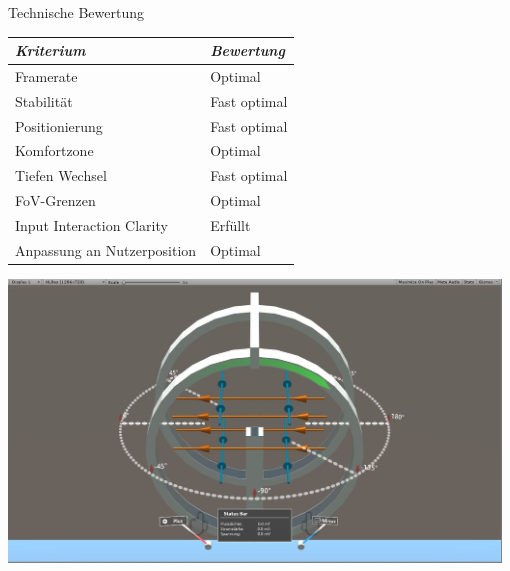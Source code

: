\begin{frame}[fragile]{Technische Bewertung}
\pause
\begin{minipage}{0.62\textwidth}
\bgroup
\setlength\extrarowheight{1pt}
\def\arraystretch{1.1}
\begin{table}
	\centering
	\begin{tabular}{m{4.1cm}|l}
		\textit{Kriterium} & \textit{Bewertung}\\
		\hline
		Framerate & Optimal\\
		\hline
		Stabilität & Fast optimal\\
		\hline
		Positionierung & Fast optimal\\
		\hline
		Komfortzone & Optimal\\
		\hline
		Tiefen Wechsel & Fast optimal\\
		\hline
		FoV-Grenzen & Optimal\\
		\hline
		Input Interaction Clarity & Erfüllt\\
		\hline
		Anpassung an Nutzerposition & Optimal\\
	\end{tabular}
\end{table}
\setlength\extrarowheight{0pt}
\def\arraystretch{1}
\egroup
\end{minipage}
\begin{minipage}{0.35\textwidth}
	\includegraphics[width=0.98\textwidth]{images/unity/fov.JPG}\\
	

\end{minipage}
\end{frame}
